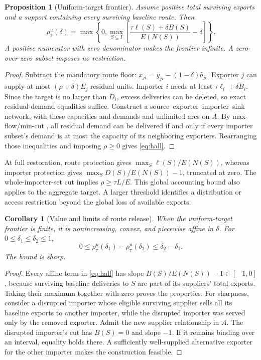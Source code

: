 \documentclass[11pt,a4paper]{article}
\newtheorem{proposition}{Proposition}
\newtheorem{corollary}{Corollary}
\begin{document}
\begin{proposition}[Uniform-target frontier]\label{prop:hall}
Assume positive total surviving exports and a support containing every surviving baseline route. Then
\begin{equation}
\rho^u_{\tau}(\delta)=\max\left\{0,\max_{S\subseteq I}\left[\frac{\tau\ell(S)+\delta B(S)}{E(N(S))}-\delta\right]\right\}.\label{eq:hall}
\end{equation}
A positive numerator with zero denominator makes the frontier infinite. A zero-over-zero subset imposes no restriction.
\end{proposition}
\begin{proof}
Subtract the mandatory route floor: $x_{ji}=y_{ji}-(1-\delta)b_{ji}$. Exporter $j$ can supply at most $(\rho+\delta)E_j$ residual units. Importer $i$ needs at least $\tau\ell_i+\delta B_i$. Since the target is no larger than $D_i$, excess deliveries can be deleted, so exact residual-demand equalities suffice. Construct a source--exporter--importer--sink network, with these capacities and demands and unlimited arcs on $A$. By max-flow/min-cut \citep{ford}, all residual demand can be delivered if and only if every importer subset's demand is at most the capacity of its neighboring exporters. Rearranging those inequalities and imposing $\rho\geq0$ gives \eqref{eq:hall}.
\end{proof}

At full restoration, route protection gives $\max_S\ell(S)/E(N(S))$, whereas importer protection gives $\max_S D(S)/E(N(S))-1$, truncated at zero. The whole-importer-set cut implies $\rho\geq\tau L/E$. This global accounting bound also applies to the aggregate target. A larger threshold identifies a distribution or access restriction beyond the global loss of available exports.

\begin{corollary}[Value and limits of route release]\label{cor:lipschitz}
When the uniform-target frontier is finite, it is nonincreasing, convex, and piecewise affine in $\delta$. For $0\leq\delta_1\leq\delta_2\leq1$,
\begin{equation}0\leq\rho^u_{\tau}(\delta_1)-\rho^u_{\tau}(\delta_2)\leq\delta_2-\delta_1.\label{eq:lipschitz}\end{equation}
The bound is sharp.
\end{corollary}
\begin{proof}
Every affine term in \eqref{eq:hall} has slope $B(S)/E(N(S))-1\in[-1,0]$, because surviving baseline deliveries to $S$ are part of its suppliers' total exports. Taking their maximum together with zero proves the properties. For sharpness, consider a disrupted importer whose eligible surviving supplier sells all its baseline exports to another importer, while the disrupted importer was served only by the removed exporter. Admit the new supplier relationship in $A$. The disrupted importer's cut has $B(S)=0$ and slope $-1$. If it remains binding over an interval, equality holds there. A sufficiently well-supplied alternative exporter for the other importer makes the construction feasible.
\end{proof}
\end{document}
